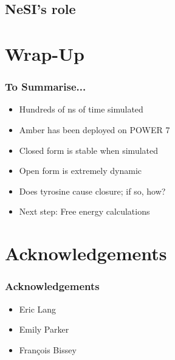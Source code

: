\documentclass{beamer}
\begin{document}
\subsection {NeSI's role}

\section{Wrap-Up}
\begin{frame}
	\frametitle{To Summarise...}
	\begin{itemize}
		\item Hundreds of ns of time simulated
		\item Amber has been deployed on POWER 7
		\item Closed form is stable when simulated
		\item Open form is extremely dynamic
		\item Does tyrosine cause closure; if so, how?
		\item Next step: Free energy calculations
	\end{itemize}
\end{frame}

\section{Acknowledgements}
\begin{frame}
  \frametitle{Acknowledgements}
   \begin{itemize}
	\item Eric Lang
	\item Emily Parker
	\item Fran\c{c}ois Bissey
	\end{itemize}
\end{frame}
\end{document}
